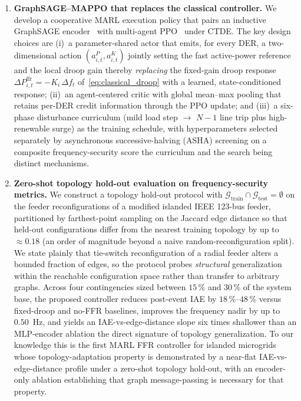 \documentclass[lettersize,journal]{IEEEtran}
\begin{document}
\begin{enumerate}[leftmargin=*]
  \item \textbf{GraphSAGE--MAPPO that replaces the classical controller.}
        We develop a cooperative MARL execution policy that pairs an inductive GraphSAGE encoder~\cite{hamilton2017graphsage,pei2023graphsage} with multi-agent PPO~\cite{yu2022mappoeffective} under CTDE. The key design choices are (i)~a parameter-shared actor that emits, for every DER, a two-dimensional action $(a^{P}_{i,t},a^{K}_{i,t})$ jointly setting the fast active-power reference and the local droop gain thereby \emph{replacing} the fixed-gain droop response $\Delta P^{\mathrm{ffr}}_{i,t}=-K_i\,\Delta f_t$ of~\eqref{eq:classical_droop} with a learned, state-conditioned response; (ii)~an agent-centered critic with global mean--max pooling
        that retains per-DER credit information through the PPO update; and (iii)~a six-phase disturbance curriculum (mild load step $\rightarrow$ $N\!-\!1$ line trip plus high-renewable surge) as the training schedule, with hyperparameters selected separately by asynchronous successive-halving (ASHA) screening on a composite frequency-security score the curriculum and the search being distinct mechanisms.

  \item \textbf{Zero-shot topology hold-out evaluation on frequency-security metrics.}
        We construct a topology hold-out protocol with $\mathcal{G}_{\text{train}}\cap\mathcal{G}_{\text{test}}=\emptyset$ on the feeder reconfigurations of a modified islanded IEEE 123-bus feeder, partitioned by farthest-point sampling on the Jaccard edge distance so that held-out configurations differ from the nearest training topology by up to $\approx\!0.18$ (an order of magnitude beyond a naive random-reconfiguration split). We state plainly that tie-switch reconfiguration of a radial feeder alters a bounded fraction of edges, so the protocol probes \emph{structural} generalization within the reachable configuration space rather than transfer to arbitrary graphs. Across four contingencies sized between $15$\,\%
        and $30$\,\% of the system base, the proposed controller reduces post-event IAE by $18$\,\%--$48$\,\% versus fixed-droop and no-FFR baselines, improves the frequency nadir by up to $0.50$~Hz, and yields an IAE-vs-edge-distance slope six times shallower than an MLP-encoder ablation the direct signature of topology generalization. To our knowledge this is the first MARL FFR controller for islanded microgrids whose topology-adaptation property is demonstrated by a near-flat IAE-vs-edge-distance profile under a zero-shot topology hold-out, with an encoder-only ablation establishing that graph message-passing is necessary for that property.


\end{enumerate}
\end{document}
